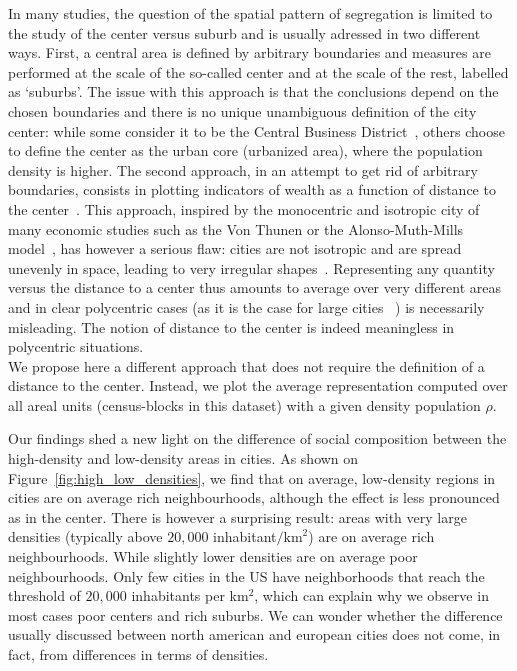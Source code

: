 In many studies, the question of the spatial pattern of segregation is limited
to the study of the center versus suburb and is usually adressed in two
different ways. First, a central area is defined by arbitrary boundaries and
measures are performed at the scale of the so-called center and at the scale of
the  rest, labelled as `suburbs'. The issue with this approach is that the
conclusions depend on the chosen boundaries and there is no unique unambiguous
definition of the city center: while some consider it to be the Central Business
District~\cite{Glaeser:2008}, others choose to define the center as the urban
core (urbanized area), where the population density is higher. The second
approach, in an attempt to get rid of arbitrary boundaries, consists in plotting
indicators of wealth as a function of distance to the
center~\cite{Glaeser:2008}. This approach, inspired by the monocentric and
isotropic city of many economic studies such as the Von Thunen or the
Alonso-Muth-Mills model~\cite{Brueckner:1987}, has however a serious flaw:
cities are not isotropic and are spread unevenly in space, leading to very
irregular shapes~\cite{Makse:1995}. Representing any quantity versus the
distance to a center thus amounts to average over very different areas and in
clear polycentric cases (as it is the case for large cities
~\cite{Louf:2013_polycentric})
is necessarily misleading. The notion of distance to the center is indeed
meaningless in polycentric situations.\\


We propose here a different approach that does not require the
definition of a distance to the center. Instead, we plot the average
representation computed over all areal units (census-blocks in this
dataset) with a given density population $\rho$.


Our findings shed a new light on the difference of social composition
between the high-density and low-density areas in cities. As shown on
Figure~\ref{fig:high_low_densities}, we find that on average,
low-density regions in cities are on average rich neighbourhoods,
although the effect is less pronounced as in the center. There is
however a surprising result: areas with very large densities
(typically above $20,000$ inhabitant$/\text{km}^2$) are on average
rich neighbourhoods. While slightly lower densities are on average poor
neighbourhoods. Only few cities in the US have neighborhoods that
reach the threshold of $20,000$ inhabitants per km$^2$, which can
explain why we observe in most cases poor centers and rich suburbs. We
can wonder whether the difference usually discussed between north
american and european cities does not come, in fact, from differences
in terms of densities. 

